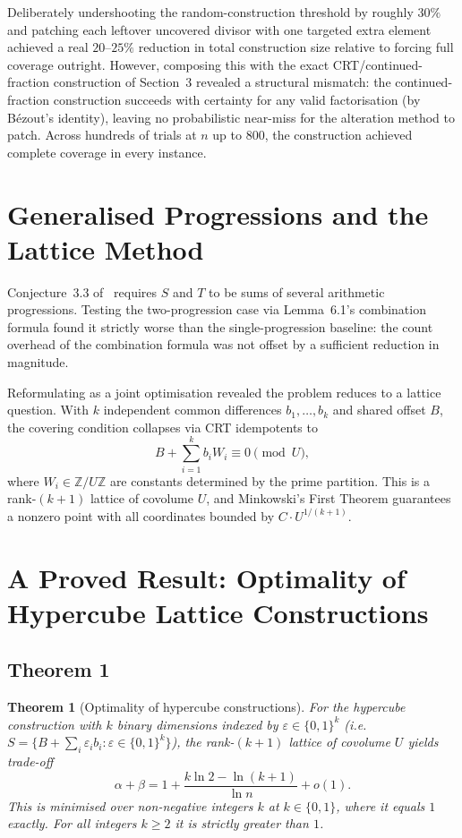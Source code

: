 \documentclass[12pt]{article}
\newtheorem{theorem}{Theorem}[section]
\theoremstyle{remark}
\newcommand{\Z}{\mathbb{Z}}
\begin{document}
Deliberately undershooting the random-construction threshold by roughly $30\%$
and patching each leftover uncovered divisor with one targeted extra element
achieved a real $20$--$25\%$ reduction in total construction size relative to
forcing full coverage outright.  However, composing this with the exact
CRT/continued-fraction construction of Section~3 revealed a structural mismatch:
the continued-fraction construction succeeds with certainty for any valid
factorisation (by B\'ezout's identity), leaving no probabilistic near-miss for
the alteration method to patch.  Across hundreds of trials at $n$ up to $800$,
the construction achieved complete coverage in every instance.

\section{Generalised Progressions and the Lattice Method}

Conjecture~3.3 of~\cite{umans2025} requires $S$ and $T$ to be sums of several
arithmetic progressions.  Testing the two-progression case via Lemma~6.1's
combination formula found it strictly worse than the single-progression
baseline: the count overhead of the combination formula was not offset by a
sufficient reduction in magnitude.

Reformulating as a joint optimisation revealed the problem reduces to a lattice
question.  With $k$ independent common differences $b_1,\ldots,b_k$ and shared
offset $B$, the covering condition collapses via CRT idempotents to
\[
  B + \sum_{i=1}^{k} b_i W_i \equiv 0 \pmod{U},
\]
where $W_i \in \Z/U\Z$ are constants determined by the prime partition.  This
is a rank-$(k+1)$ lattice of covolume $U$, and Minkowski's First Theorem
guarantees a nonzero point with all coordinates bounded by
$C \cdot U^{1/(k+1)}$.

\section{A Proved Result: Optimality of Hypercube Lattice Constructions}
\label{sec:hypercube}

\subsection{Theorem 1}

\begin{theorem}[Optimality of hypercube constructions]
\label{thm:hypercube}
For the hypercube construction with $k$ binary dimensions indexed by $\varepsilon
\in \{0,1\}^k$ (i.e.\ $S = \{B + \sum_i \varepsilon_i b_i : \varepsilon \in
\{0,1\}^k\}$), the rank-$(k+1)$ lattice of covolume $U$ yields trade-off
\[
  \alpha + \beta
  = 1 + \frac{k \ln 2 - \ln(k+1)}{\ln n} + o(1).
\]
This is minimised over non-negative integers $k$ at $k \in \{0,1\}$, where it
equals $1$ exactly.  For all integers $k \ge 2$ it is strictly greater than $1$.
\end{theorem}
\end{document}
